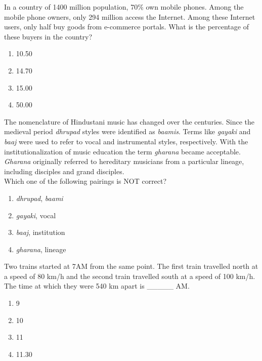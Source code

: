     \item In a country of 1400 million population, 70\% own mobile phones. Among the mobile phone owners, only 294 million access the Internet. Among these Internet users, only half buy goods from e-commerce portals. What is the percentage of these buyers in the country?
    \begin{enumerate}
        \item 10.50
        \item 14.70
        \item 15.00
        \item 50.00
    \end{enumerate}
    
    \item The nomenclature of Hindustani music has changed over the centuries. Since the medieval period \textit{dhrupad} styles were identified as \textit{baamis}. Terms like \textit{gayaki} and \textit{baaj} were used to refer to vocal and instrumental styles, respectively. With the institutionalization of music education the term \textit{gharana} became acceptable. \textit{Gharana} originally referred to hereditary musicians from a particular lineage, including disciples and grand disciples. \\
    Which one of the following pairings is NOT correct?
    \begin{enumerate}
        \item \textit{dhrupad}, \textit{baami}
        \item \textit{gayaki}, vocal
        \item \textit{baaj}, institution
        \item \textit{gharana}, lineage
    \end{enumerate}
    
    \item Two trains started at 7AM from the same point. The first train travelled north at a speed of 80 km/h and the second train travelled south at a speed of 100 km/h. The time at which they were 540 km apart is \_\_\_\_\_ AM.
    \begin{enumerate}
        \item 9
        \item 10
        \item 11
        \item 11.30
    \end{enumerate}
    
